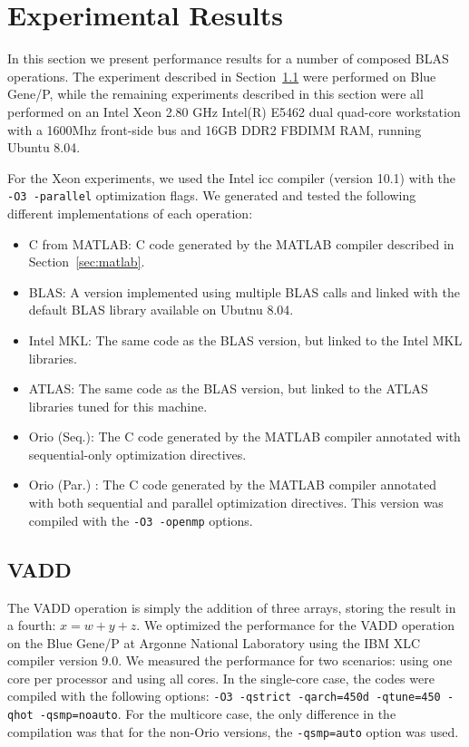 \documentclass[11pt]{article}
\begin{document}
\section{Experimental Results}
\label{sec:experiments}

In this section we present performance results for a number of composed BLAS operations. The experiment described in Section~\ref{sec:vadd} were performed on Blue Gene/P, while the remaining experiments described in this section were all performed on an Intel Xeon 2.80 GHz Intel(R) E5462 dual quad-core workstation with a 1600Mhz front-side bus and 16GB DDR2 FBDIMM RAM, running Ubuntu 8.04.


For the Xeon experiments, we used the Intel icc compiler (version 10.1) with the \texttt{-O3 -parallel} optimization flags. We generated and tested the following different implementations of each operation:
\begin{itemize}
\item C from MATLAB: C code generated by the MATLAB compiler described in Section~\ref{sec:matlab}.
\item BLAS: A version implemented using multiple BLAS calls and linked with the default BLAS library available on Ubutnu 8.04.
\item Intel MKL: The same code as the BLAS version, but linked to the Intel MKL libraries.
\item ATLAS: The same code as the BLAS version, but linked to the ATLAS libraries tuned for this machine.
\item Orio (Seq.): The C code generated by the MATLAB compiler annotated with sequential-only optimization directives.
\item Orio (Par.) : The C code generated by the MATLAB compiler annotated with both sequential and parallel optimization directives. This version was compiled with the \texttt{-O3 -openmp} options.
\end{itemize}

\subsection{VADD}
\label{sec:vadd}

The VADD operation is simply the addition of three arrays, storing the result in a fourth: $x = w + y + z$.
We optimized the performance for the VADD operation on the Blue Gene/P at Argonne National Laboratory using the IBM XLC compiler version 9.0. We measured the performance for two scenarios: using one core per processor and using all cores. In the single-core case, the codes were compiled with the following options: \texttt{-O3 -qstrict -qarch=450d -qtune=450 -qhot -qsmp=noauto}. For the multicore case, the only difference in the compilation was that for the non-Orio versions, the \texttt{-qsmp=auto} option was used.
\end{document}
